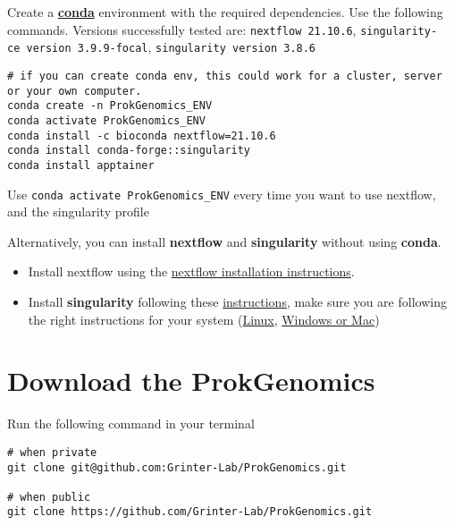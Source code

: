 \documentclass[
]{book}
\begin{document}
Create a \textbf{\href{https://conda.io/projects/conda/en/latest/user-guide/getting-started.html}{conda}} environment with the required dependencies. Use the following commands. Versions successfully tested are: \texttt{nextflow\ 21.10.6}, \texttt{singularity-ce\ version\ 3.9.9-focal}, \texttt{singularity\ version\ 3.8.6}

\begin{verbatim}
# if you can create conda env, this could work for a cluster, server or your own computer. 
conda create -n ProkGenomics_ENV
conda activate ProkGenomics_ENV
conda install -c bioconda nextflow=21.10.6
conda install conda-forge::singularity
conda install apptainer
\end{verbatim}

Use \texttt{conda\ activate\ ProkGenomics\_ENV} every time you want to use nextflow, and the singularity profile

Alternatively, you can install \textbf{nextflow} and \textbf{singularity} without using \textbf{conda}.

\begin{itemize}
\item
  Install nextflow using the \href{https://www.nextflow.io/docs/latest/getstarted.html}{nextflow installation instructions}.
\item
  Install \textbf{singularity} following these \href{https://docs.sylabs.io/guides/3.0/user-guide/installation.html\#overview}{instructions}, make sure you are following the right instructions for your system (\href{https://docs.sylabs.io/guides/3.0/user-guide/installation.html\#install-on-linux}{Linux}, \href{https://docs.sylabs.io/guides/3.0/user-guide/installation.html\#install-on-windows-or-mac}{Windows or Mac})
\end{itemize}

\hypertarget{download-the-prokgenomics}{%
\section{Download the ProkGenomics}\label{download-the-prokgenomics}}

Run the following command in your terminal

\begin{verbatim}
# when private
git clone git@github.com:Grinter-Lab/ProkGenomics.git

# when public
git clone https://github.com/Grinter-Lab/ProkGenomics.git
\end{verbatim}
\end{document}
